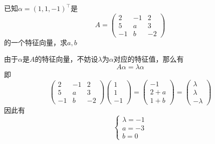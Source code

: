 \begin{example}
    已知$\alpha=(1,1,-1)^\intercal$是
    \[
        A =
        \begin{pmatrix}
            2  & -1 & 2  \\
            5  & a  & 3  \\
            -1 & b  & -2
        \end{pmatrix}
    \]
    的一个特征向量，求$a,b$
\end{example}
\begin{solution}
    由于$\alpha$是$A$的特征向量，不妨设$\lambda$为$\alpha$对应的特征值，那么有
    \[ A\alpha = \lambda\alpha \]
    即
    \[
        \begin{pmatrix}
            2  & -1 & 2  \\
            5  & a  & 3  \\
            -1 & b  & -2
        \end{pmatrix}
        \begin{pmatrix}
            1 \\1\\-1
        \end{pmatrix}
        =
        \begin{pmatrix}
            -1 \\ 2+a \\ 1+b
        \end{pmatrix}
        =
        \begin{pmatrix}
            \lambda \\ \lambda \\ -\lambda
        \end{pmatrix}
    \]
    因此有
    \[
        \begin{cases}
            \lambda = -1 \\
            a = -3       \\
            b=0
        \end{cases}
    \]
\end{solution}

